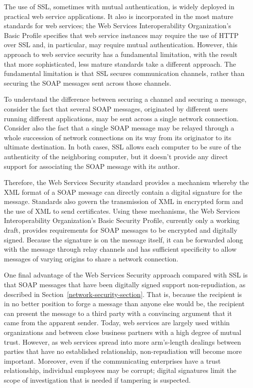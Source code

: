 The use of SSL, sometimes with mutual authentication, is widely
deployed in practical web service applications.  It also is
incorporated in the most mature standards for web services; the Web
Services Interoperability Organization's Basic Profile specifies that
web service instances may require the use of HTTP over SSL and, in
particular, may require mutual authentication.  However, this approach to
web service security has a fundamental limitation, with the result
that more sophisticated, less mature standards take a different approach.
The fundamental limitation is that SSL secures communication channels,
rather than securing the SOAP messages sent across those channels.

To understand the difference between securing a channel and securing a
message, consider the fact that several SOAP messages, originated by
different users running different applications, may be sent across a
single network connection.  Consider also the fact that a single SOAP
message may be relayed through a whole succession of network
connections on its way from its originator to its ultimate
destination.  In both cases, SSL allows each computer to be sure of
the authenticity of the neighboring computer, but it doesn't provide
any direct support for associating the SOAP message with its author.

Therefore, the Web Services Security standard provides a mechanism
whereby the XML format of a SOAP message can directly contain a
digital signature for the message.  Standards also govern the
transmission of XML in encrypted form and the use of XML to send
certificates.  Using these mechanisms, the Web Services
Interoperability Organization's Basic Security Profile, currently only
a working draft, provides requirements for SOAP messages to be
encrypted and digitally signed.  Because the signature is on the
message itself, it can be forwarded along with the message through
relay channels and has sufficient specificity to allow messages of
varying origins to share a network connection.

One final advantage of the Web Services Security approach compared
with SSL is that SOAP messages that have been digitally signed support
non-repudiation, as described in
Section~\ref{network-security-section}.  That is, because the
recipient is in no better position to forge a message than anyone else
would be, the recipient can present the message to a third party with
a convincing argument that it came from the apparent sender.  Today,
web services are largely used within organizations and between close
business partners with a high degree of mutual trust.  However, as web
services spread into more arm's-length dealings between parties that
have no established relationship, non-repudiation will become more
important.  Moreover, even if the communicating enterprises have a
trust relationship, individual employees may be corrupt; digital
signatures limit the scope of investigation that is needed if
tampering is suspected.

